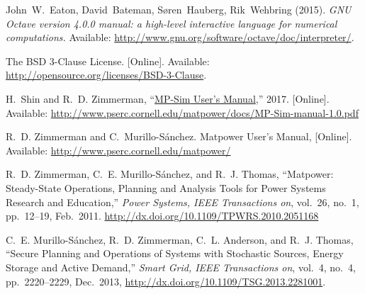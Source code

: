 \documentclass[12pt]{article}
\newcommand{\matpower}[0]{{\sc Matpower}}
\newcommand{\matpowerurl}[0]{http://www.pserc.cornell.edu/matpower/}
\newcommand{\mpsim}[0]{{MP-Sim}}
\newcommand{\mpsimver}[0]{1.0}
\newcommand{\mpsimmanurl}[0]{http://www.pserc.cornell.edu/matpower/docs/MP-Sim-manual-\mpsimver.pdf}
\newcommand{\mpsimman}[0]{\href{\mpsimmanurl}{\mpsim{} User's Manual}}
\numberwithin{equation}{section}
\numberwithin{table}{section}
\numberwithin{figure}{section}
\begin{document}
\clearpage
\begin{thebibliography}{99}

John~W.~Eaton, David~Bateman, S{\o}ren~Hauberg, Rik~Wehbring (2015). \emph{GNU Octave version 4.0.0 manual: a high-level interactive language for numerical computations.} Available: \url{http://www.gnu.org/software/octave/doc/interpreter/}.

The BSD 3-Clause License. [Online]. Available: \url{http://opensource.org/licenses/BSD-3-Clause}.

H.~Shin and R.~D. Zimmerman, ``\mpsimman{},'' 2017.
  [Online]. Available: \url{\mpsimmanurl}

R.~D. Zimmerman and C.~Murillo-S{\'a}nchez. \matpower{} User's Manual,
  [Online]. Available: \url{\matpowerurl}

R.~D. Zimmerman, C.~E. Murillo-S{\'a}nchez, and R.~J. Thomas, ``\matpower{}: Steady-State Operations, Planning and Analysis Tools for Power Systems Research and Education,'' \emph{Power Systems, IEEE Transactions on}, vol.~26, no.~1, pp.~12--19, Feb.~2011. \url{http://dx.doi.org/10.1109/TPWRS.2010.2051168}

C.~E. Murillo-S{\'a}nchez, R.~D. Zimmerman, C.~L. Anderson, and R.~J. Thomas, ``Secure Planning and Operations of Systems with Stochastic Sources, Energy Storage and Active Demand,'' \emph{Smart Grid, IEEE Transactions on}, vol.~4, no.~4, pp.~2220--2229, Dec.~2013,
\url{http://dx.doi.org/10.1109/TSG.2013.2281001}.

\end{thebibliography}
\end{document}
